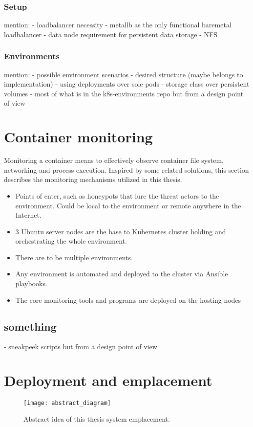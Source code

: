 \subsubsection*{Setup \label{design:env-arch:k8s:setup}}
mention:
- loadbalancer necessity - metallb as the only functional baremetal loadbalancer
- data node requirement for persistent data storage
  - NFS

\subsubsection*{Environments \label{design:env-arch:k8s:envs}}
mention:
- possible environment scenarios
- desired structure (maybe belongs to implementation)
	- using deployments over sole pods
	- storage class over persistent volumes
- most of what is in the k8s-environments repo but from a design point of view

\section{Container monitoring \label{design:con-mon}}
Monitoring a container means to effectively observe container file system, networking and process execution. Inspired by some related solutions, this section describes the monitoring mechanisms utilized in this thesis.

\begin{itemize}
	\item 
	Points of enter, such as honeypots that lure the threat actors to the environment. Could be local to the environment or remote anywhere in the Internet.
	\item 
	3 Ubuntu server nodes are the base to Kubernetes cluster holding and orchestrating the whole environment.
	\item 
	There are to be multiple environments.
	\item
	Any environment is automated and deployed to the cluster via Ansible playbooks.
	\item 
	The core monitoring tools and programs are deployed on the hosting nodes
\end{itemize}

\subsection{something}
- sneakpeek scripts but from a design point of view

\section{Deployment and emplacement \label{design:deployment}}

\begin{figure}[h]
	\centering
	\texttt{[image: abstract\_diagram]}
	\caption{Abstract idea of this thesis system emplacement.}
	\label{image:design:abstract}
\end{figure}